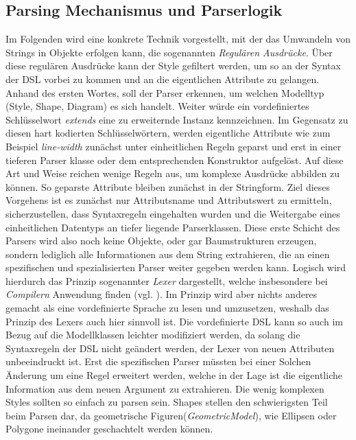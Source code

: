 \subsection{Parsing Mechanismus und Parserlogik}\label{ansatzlexer}Im Folgenden wird eine konkrete Technik vorgestellt, mit der das Umwandeln von Strings in Objekte erfolgen kann,
die sogenannten \textit{Regulären Ausdrücke}. Über diese regulären Ausdrücke kann der Style gefiltert werden, um so an der Syntax der DSL vorbei zu kommen und an die eigentlichen Attribute zu gelangen.
Anhand des ersten Wortes, soll der Parser erkennen, um welchen Modelltyp (Style, Shape, Diagram) es sich handelt. 
Weiter würde ein vordefiniertes Schlüsselwort \textit{extends} eine zu erweiternde Instanz kennzeichnen. Im Gegensatz zu diesen hart kodierten Schlüsselwörtern, werden eigentliche Attribute wie zum Beispiel \textit{line-width} zunächst unter einheitlichen Regeln geparst
und erst in einer tieferen Parser klasse oder dem entsprechenden Konstruktor aufgelöst. Auf diese Art und Weise reichen wenige Regeln aus, um komplexe Ausdrücke abbilden zu können. So geparste Attribute bleiben zunächst in der Stringform. Ziel dieses Vorgehens ist es zunächst nur Attributsname und Attributswert zu ermitteln, sicherzustellen, dass Syntaxregeln eingehalten wurden und die Weitergabe eines einheitlichen Datentyps an tiefer liegende Parserklassen. Diese erste Schicht des Parsers wird also noch keine Objekte, oder gar Baumstrukturen erzeugen, sondern lediglich alle Informationen aus dem String extrahieren, die an einen spezifischen und spezialisierten Parser weiter gegeben werden kann.
Logisch wird hierdurch das Prinzip sogenannter \textit{Lexer} dargestellt, welche insbesondere bei \textit{Compilern} Anwendung finden (vgl. ). Im Prinzip wird aber nichts anderes gemacht als eine vordefinierte Sprache zu lesen und umzusetzen, weshalb das Prinzip des Lexers auch hier sinnvoll ist.
Die vordefinierte DSL kann so auch im Bezug auf die Modellklassen leichter modifiziert werden, da solang die Syntaxregeln der DSL nicht geändert werden, der Lexer von neuen Attributen unbeeindruckt ist. Erst die spezifischen Parser müssten bei einer Solchen Änderung um eine Regel erweitert werden, welche in der Lage ist die eigentliche Information aus dem neuen Argument zu extrahieren.
Die wenig komplexen Styles sollten so einfach zu parsen sein. Shapes stellen den schwierigsten Teil beim Parsen dar, da geometrische Figuren(\textit{GeometricModel}), wie Ellipsen oder Polygone ineinander geschachtelt werden können.

